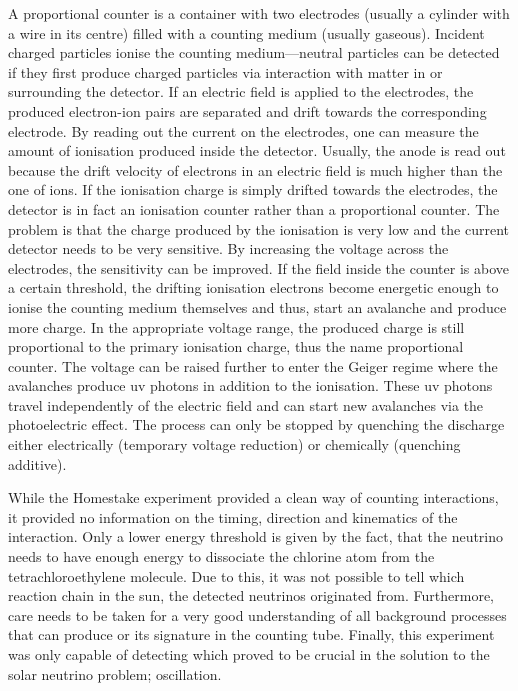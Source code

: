 A proportional counter is a container with two electrodes (usually a cylinder with a wire in its centre) filled with a counting medium (usually gaseous).
Incident charged particles ionise the counting medium---neutral particles can be detected if they first produce charged particles via interaction with matter in or surrounding the detector.
If an electric field is applied to the electrodes, the produced electron-ion pairs are separated and drift towards the corresponding electrode.
By reading out the current on the electrodes, one can measure the amount of ionisation produced inside the detector.
Usually, the anode is read out because the drift velocity of electrons in an electric field is much higher than the one of ions.
If the ionisation charge is simply drifted towards the electrodes, the detector is in fact an ionisation counter rather than a proportional counter.
The problem is that the charge produced by the ionisation is very low and the current detector needs to be very sensitive.
By increasing the voltage across the electrodes, the sensitivity can be improved.
If the field inside the counter is above a certain threshold, the drifting ionisation electrons become energetic enough to ionise the counting medium themselves and thus, start an avalanche and produce more charge.
In the appropriate voltage range, the produced charge is still proportional to the primary ionisation charge, thus the name proportional counter.
The voltage can be raised further to enter the Geiger regime where the avalanches produce \gls{uv} photons in addition to the ionisation.
These \gls{uv} photons travel independently of the electric field and can start new avalanches via the photoelectric effect.
The process can only be stopped by quenching the discharge either electrically (temporary voltage reduction) or chemically (quenching additive).

While the Homestake experiment provided a clean way of counting \Pgne interactions, it provided no information on the timing, direction and kinematics of the interaction.
Only a lower energy threshold is given by the fact, that the neutrino needs to have enough energy to dissociate the chlorine atom from the tetrachloroethylene molecule.
Due to this, it was not possible to tell which reaction chain in the sun, the detected neutrinos originated from.
Furthermore, care needs to be taken for a very good understanding of all background processes that can produce  or its signature in the counting tube.
Finally, this experiment was only capable of detecting \Pgne which proved to be crucial in the solution to the solar neutrino problem; oscillation.

